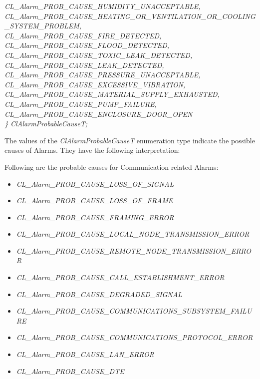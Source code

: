 \begin{flushleft}
\begin{tabbing}
\>\>\>\>\textit{CL\_Alarm\_PROB\_CAUSE\_HUMIDITY\_UNACCEPTABLE,}\\
\>\>\>\>\textit{CL\_Alarm\_PROB\_CAUSE\_HEATING\_OR\_VENTILATION\_OR\_COOLING\_SYSTEM\_PROBLEM,}\\
\>\>\>\>\textit{CL\_Alarm\_PROB\_CAUSE\_FIRE\_DETECTED,}\\
\>\>\>\>\textit{CL\_Alarm\_PROB\_CAUSE\_FLOOD\_DETECTED,}\\
\>\>\>\>\textit{CL\_Alarm\_PROB\_CAUSE\_TOXIC\_LEAK\_DETECTED,}\\
\>\>\>\>\textit{CL\_Alarm\_PROB\_CAUSE\_LEAK\_DETECTED,}\\
\>\>\>\>\textit{CL\_Alarm\_PROB\_CAUSE\_PRESSURE\_UNACCEPTABLE,}\\
\>\>\>\>\textit{CL\_Alarm\_PROB\_CAUSE\_EXCESSIVE\_VIBRATION,}\\
\>\>\>\>\textit{CL\_Alarm\_PROB\_CAUSE\_MATERIAL\_SUPPLY\_EXHAUSTED,}\\
\>\>\>\>\textit{CL\_Alarm\_PROB\_CAUSE\_PUMP\_FAILURE,}\\
\>\>\>\>\textit{CL\_Alarm\_PROB\_CAUSE\_ENCLOSURE\_DOOR\_OPEN}\\ 
\textit{\} ClAlarmProbableCauseT;}\end{tabbing}
The values of the \textit{ClAlarmProbableCauseT} enumeration type indicate the possible causes of
Alarms. They have the following interpretation:
\par
Following are the probable causes for Communication related Alarms:
\begin{itemize}
\item
\textit{CL\_\-Alarm\_\-PROB\_\-CAUSE\_\-LOSS\_\-OF\_\-SIGNAL}
\item \textit{CL\_\-Alarm\_\-PROB\_\-CAUSE\_\-LOSS\_\-OF\_\-FRAME}
\item \textit{CL\_\-Alarm\_\-PROB\_\-CAUSE\_\-FRAMING\_\-ERROR}
\item \textit{CL\_\-Alarm\_\-PROB\_\-CAUSE\_\-LOCAL\_\-NODE\_\-TRANSMISSION\_\-ERROR}
\item \textit{CL\_\-Alarm\_\-PROB\_\-CAUSE\_\-REMOTE\_\-NODE\_\-TRANSMISSION\_\-ERROR}
\item \textit{CL\_\-Alarm\_\-PROB\_\-CAUSE\_\-CALL\_\-ESTABLISHMENT\_\-ERROR}
\item \textit{CL\_\-Alarm\_\-PROB\_\-CAUSE\_\-DEGRADED\_\-SIGNAL}
\item \textit{CL\_\-Alarm\_\-PROB\_\-CAUSE\_\-COMMUNICATIONS\_\-SUBSYSTEM\_\-FAILURE}
\item \textit{CL\_\-Alarm\_\-PROB\_\-CAUSE\_\-COMMUNICATIONS\_\-PROTOCOL\_\-ERROR}
\item \textit{CL\_\-Alarm\_\-PROB\_\-CAUSE\_\-LAN\_\-ERROR}
\item \textit{CL\_\-Alarm\_\-PROB\_\-CAUSE\_\-DTE}
\end{itemize}



\end{flushleft}
